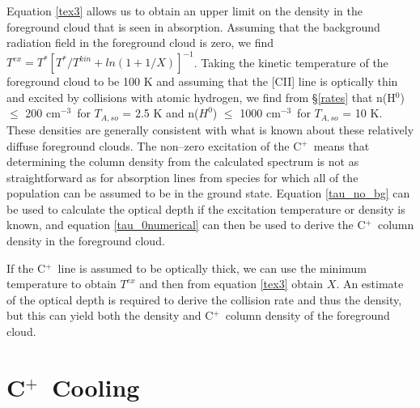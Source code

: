 \documentclass[12pt]{aastex}
\def \cc{cm$^{-3}$}
\def \cp{C$^+$}
\def \C2{C{\sc II}}
\begin{document}
Equation \ref{tex3} allows us to obtain an upper limit on the density in the foreground cloud that is seen in absorption.  
Assuming that the background radiation field in the foreground cloud is zero, we find $T^{ex}= T^*[T^*/T^{kin} + ln(1 + 1/X)]^{-1}$.  
 Taking the kinetic temperature of the foreground cloud to be 100 K and assuming that the [\C2] line is optically thin and excited by collisions with atomic hydrogen, we find from \S\ref{rates} that n(H$^0$) $\leq$ 200 \cc\ for $T_{A, so}$ = 2.5 K and n($H^0$) $\leq$ 1000 \cc\ for $T_{A, so}$ = 10 K.  
 These densities are generally consistent with what is known about these relatively diffuse foreground clouds.
 The non--zero excitation of the \cp\ means that determining the column density from the calculated spectrum is not as straightforward as for absorption lines from species for which all of the population can be assumed to be in the ground state.
Equation \ref{tau_no_bg} can be used to calculate the optical depth if the excitation temperature or density is known, and equation \ref{tau_0numerical} can then be used to derive the \cp\ column density in the foreground cloud.  
 
If the \cp\ line is assumed to be optically thick, we can use the minimum temperature to obtain $T^{ex}$ and then from equation \ref{tex3} obtain $X$.  
An estimate of the optical depth is required to derive the collision rate and thus the density, but this can yield both the density and \cp\ column density of the foreground cloud.




\section{\cp\ Cooling}
\end{document}
